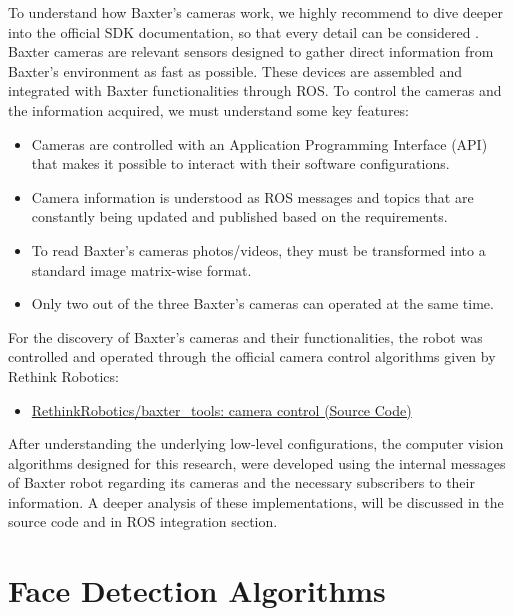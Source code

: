 \documentclass[11pt]{report} %
\begin{document}
To understand how Baxter's cameras work, we highly recommend to dive deeper into the official SDK documentation, so that every detail can be considered \citep{cite_baxter_cameras_wiki}.\\

Baxter cameras are relevant sensors designed to gather direct information from Baxter's environment as fast as possible. These devices are assembled and integrated with Baxter functionalities through ROS. To control the cameras and the information acquired, we must understand some key features:

\begin{itemize}
    \item Cameras are controlled with an Application Programming Interface (API) that makes it possible to interact with their software configurations.
    \item Camera information is understood as ROS messages and topics that are constantly being updated and published based on the requirements.
    \item To read Baxter's cameras photos/videos, they must be transformed into a standard image matrix-wise format.
    \item Only two out of the three Baxter's cameras can operated at the same time.
\end{itemize}

For the discovery of Baxter's cameras and their functionalities, 
the robot was controlled and operated through the official camera control algorithms given by Rethink Robotics:

\begin{itemize}
    \color{blue}
    \item \href{https://github.com/RethinkRobotics/baxter_tools/blob/master/scripts/camera_control.py}{RethinkRobotics/baxter\_tools: camera control (Source Code)}
\end{itemize}

After understanding the underlying low-level configurations, the computer vision algorithms designed for this research, were developed using the internal messages of Baxter robot regarding its cameras and the necessary subscribers to their information. A deeper analysis of these implementations, will be discussed in the source code and in ROS integration section.\\


\section{Face Detection Algorithms}
\end{document}
